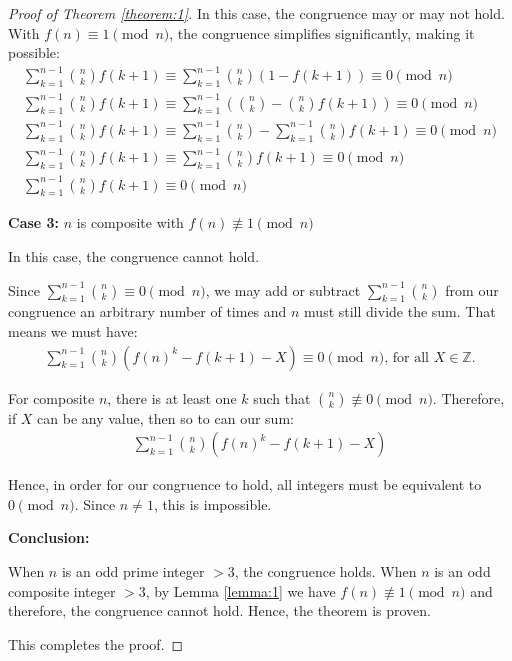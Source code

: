 \documentclass{article}
\theoremstyle{plain}
\theoremstyle{definition}
\begin{document}
\begin{proof}[Proof of Theorem \ref{theorem:1}]
In this case, the congruence may or may not hold. With $f(n) \equiv 1 \pmod{n}$, the congruence simplifies significantly, making it possible:
\begin{align}
    \sum_{k=1}^{n-1} \binom{n}{k} f(k+1) \equiv \sum_{k=1}^{n-1} \binom{n}{k} \left(1 - f(k+1)\right) \equiv 0 \pmod{n} \\
    \sum_{k=1}^{n-1} \binom{n}{k} f(k+1) \equiv \sum_{k=1}^{n-1} \left(\binom{n}{k} - \binom{n}{k} f(k+1)\right) \equiv 0 \pmod{n} \\
    \sum_{k=1}^{n-1} \binom{n}{k} f(k+1) \equiv \sum_{k=1}^{n-1} \binom{n}{k} - \sum_{k=1}^{n-1} \binom{n}{k} f(k+1) \equiv 0 \pmod{n} \\
    \sum_{k=1}^{n-1} \binom{n}{k} f(k+1) \equiv \sum_{k=1}^{n-1} \binom{n}{k} f(k+1) \equiv 0 \pmod{n} \\
    \sum_{k=1}^{n-1} \binom{n}{k} f(k+1) \equiv 0 \pmod{n}
\end{align}

\item \textbf{Case 3:} $n$ is composite with $f(n) \not\equiv 1 \pmod{n}$

In this case, the congruence cannot hold. 

Since $\sum_{k=1}^{n-1} \binom{n}{k} \equiv 0 \pmod{n}$, we may add or subtract $\sum_{k=1}^{n-1} \binom{n}{k}$ from our congruence an arbitrary number of times and $n$ must still divide the sum. That means we must have:
\begin{align}
\sum_{k=1}^{n-1} \binom{n}{k} \left(f(n)^k - f(k+1) - X\right) \equiv 0 \pmod{n} \text{, for all } X \in \mathbb{Z}.
\end{align}

For composite $n$, there is at least one $k$ such that $\binom{n}{k} \not\equiv 0 \pmod{n}$. Therefore, if $X$ can be any value, then so to can our sum:
\begin{align}
\sum_{k=1}^{n-1} \binom{n}{k} \left(f(n)^k - f(k+1) - X\right)
\end{align}

Hence, in order for our congruence to hold, all integers must be equivalent to $0 \pmod{n}$. Since $n\not=1$, this is impossible.

\textbf{Conclusion:}

When $n$ is an odd prime integer $>3$, the congruence holds. When $n$ is an odd composite integer $>3$, by Lemma \ref{lemma:1} we have $f(n) \not\equiv 1 \pmod{n}$ and therefore, the congruence cannot hold. Hence, the theorem is proven.

This completes the proof.
\end{proof}
\end{document}
